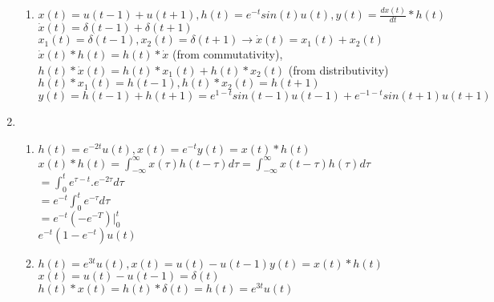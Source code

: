 \documentclass[10pt,a4paper, margin=1in]{article}
\begin{document}
\begin{enumerate}
\begin{enumerate}
    \item %
    $x(t)=u(t-1)+u(t+1), h(t)=e^{-t}sin(t)u(t), y(t)=\frac{dx(t)}{dt}*h(t)$ \vspace{0.1cm} \\
    $\Dot{x}(t)=\delta(t-1) + \delta(t+1)$ \vspace{0.1cm} \\
    $x_1(t) = \delta(t-1), x_2(t)=\delta(t+1) \longrightarrow \Dot{x}(t) = x_1(t) + x_2(t)$ \vspace{0.2cm} \\
    $\Dot{x}(t)*h(t)=h(t)*\Dot{x}$ (from commutativity), $h(t)*\Dot{x}(t)=h(t)*x_1(t)+h(t)*x_2(t)$ (from distributivity) \vspace{0.2cm} \\
    $h(t)*x_1(t) = h(t-1), h(t)*x_2(t) = h(t+1)$ \vspace{0.1cm} \\
    $y(t) = h(t-1)+h(t+1) = e^{1-t}sin(t-1)u(t-1)+e^{-1-t}sin(t+1)u(t+1)$
    \end{enumerate}
    \vspace{0.3cm} 

\item %
    \begin{enumerate}
    \item %
    $h(t) = e^{-2t}u(t), x(t) = e^{-t} y(t)=x(t)*h(t)$ \vspace{0.1cm} \\
    $x(t)*h(t) = \int_{-\infty}^{\infty} x(\tau)h(t-\tau)d\tau = \int_{-\infty}^{\infty}x(t-\tau)h(\tau)d\tau$ \vspace{0.1cm} \\
    $= \int_{0}^{t}e^{\tau-t}.e^{-2\tau}d\tau$ \vspace{0.1cm} \\
    $= e^{-t}\int_{0}^{t}e^{-\tau}d\tau$ \vspace{0.1cm} \\
    $= e^{-t}(-e^{-T})|^t_0$ \vspace{0.1cm} \\
    $e^{-t}(1-e^{-t})u(t)$ \vspace{0.3cm} \\
    \item %
    $h(t)=e^{3t}u(t), x(t) = u(t)-u(t-1) y(t) = x(t)*h(t)$ \vspace{0.1cm} \\
    $x(t) = u(t) - u(t-1) = \delta(t)$ \vspace{0.1cm} \\
    $h(t)*x(t) = h(t)*\delta(t) = h(t) = e^{3t}u(t)$ \vspace{0.3cm} \\
    \end{enumerate}


\end{enumerate}
\end{document}
